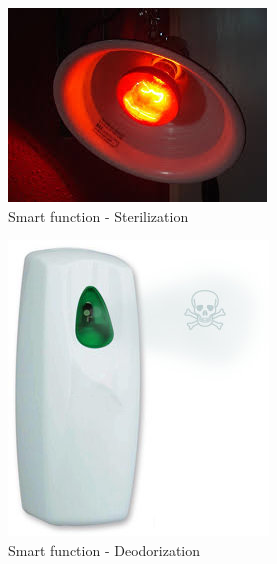 \documentclass[conference]{IEEEtran}
\begin{document}
\begin{figure}[H]
\begin{center}
    \includegraphics[scale=0.4]{jh2}
    \caption{Smart function - Sterilization} \label{fig:label}
\end{center}
\end{figure}
\begin{figure}[H]
\begin{center}
    \includegraphics[scale=0.35]{jh3}
    \caption{Smart function - Deodorization} \label{fig:label}
\end{center}
\end{figure}
\end{document}
